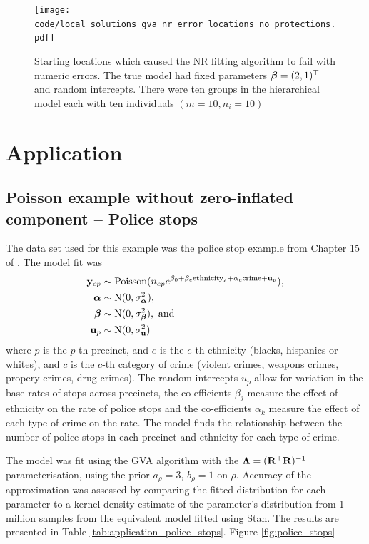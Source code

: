 			\begin{figure}
				\texttt{[image: code/local\_solutions\_gva\_nr\_error\_locations\_no\_protections.pdf]}
				\label{fig:stability_locations_nr}
				\caption{Starting locations which caused the NR fitting algorithm to fail with numeric errors. The true model 						had fixed parameters ${\boldsymbol \beta} = (2, 1)^\top$ and random intercepts. There were ten groups in the
					hierarchical model each	with ten individuals $(m=10, n_i=10)$}
			\end{figure}
			
			\section{Application}
			\label{sec:application}
			
			\subsection{Poisson example without zero-inflated component -- Police stops}
			The data set used for this example was the police stop example from Chapter 15 of \citep{Gelman2007}.
			The model fit was
			\begin{align*}
				{\bf y}_{ep}        & \sim \text{Poisson}(n_{ep} e^{\beta_0 + \beta_e \text{ethnicity}_e + \alpha_{c} \text{crime} + {\bf u}_p}), \\
				{\boldsymbol \alpha}				& \sim \text{N}(0, \sigma_{\boldsymbol \alpha}^2),	\\
				{\boldsymbol \beta}        & \sim \text{N}(0, \sigma_{\boldsymbol \beta}^2), \text{ and }\\
				{\bf u}_p         & \sim \text{N}(0, \sigma_{\bf u}^2)
			\end{align*}
			where $p$ is the $p$-th precinct, and $e$ is the $e$-th ethnicity (blacks, hispanics or whites), and $c$ is
			the $c$-th category of crime (violent crimes, weapons crimes, propery crimes, drug crimes). The random 
			intercepts $u_p$ allow for variation in the base rates of stops across precincts,
			the co-efficients $\beta_j$ measure the effect of ethnicity on the rate of police stops and
			the co-efficients $\alpha_k$ measure the effect of each type of crime on the rate.
			The model finds the relationship between the number of police stops in each precinct and 
			ethnicity	for each type of crime.
			
			The model was fit using the GVA algorithm with the ${\boldsymbol \Lambda} = ({\bf R}^\top {\bf R})^{-1}$ parameterisation, using
			the prior $a_\rho = 3$, $b_\rho = 1$ on $\rho$. Accuracy of the approximation was assessed by comparing the
			fitted distribution for each parameter to a kernel density estimate of the parameter's distribution from
			1 million samples from the equivalent model fitted using Stan. The results are presented in Table
			\ref{tab:application_police_stops}. Figure \ref{fig:police_stops}
			
